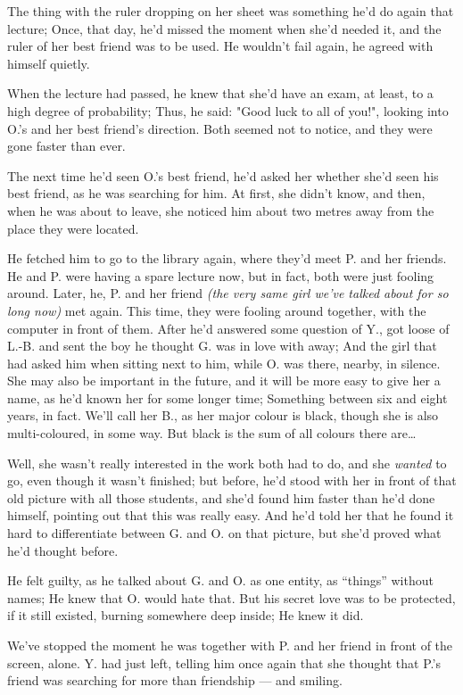 The thing with the ruler dropping on her sheet was something he'd do again that lecture; Once, that day, he'd missed the moment when she'd needed it, and the ruler of her best friend was to be used. 
He wouldn't fail again, he agreed with himself quietly.

When the lecture had passed, he knew that she'd have an exam, at least, to a high degree of probability; Thus, he said: "Good luck to all of you!", looking into O.'s and her best friend's direction. 
Both seemed not to notice, and they were gone faster than ever.

The next time he'd seen O.'s best friend, he'd asked her whether she'd seen his best friend, as he was searching for him. At first, she didn't know, and then, when he was about to leave, she noticed him about two metres away from the place they were located.

He fetched him to go to the library again, where they'd meet P. and her friends. He and P. were having a spare lecture now, but in fact, both were just fooling around. 
Later, he, P. and her friend \emph{(the very same girl we've talked about for so long now)} met again. This time, they were fooling around together, with the computer in front of them. After he'd answered some question of Y., got loose of L.-B. and sent the boy he thought G. was in love with away; And the girl that had asked him when sitting next to him, while O. was there, nearby, in silence. She may also be important in the future, and it will be more easy to give her a name, as he'd known her for some longer time; Something between six and eight years, in fact. We'll call her B., as her major colour is black, though she is also multi-coloured, in some way. But black is the sum of all colours there are\dots{}

Well, she wasn't really interested in the work both had to do, and she \emph{wanted} to go, even though it wasn't finished; but before, he'd stood with her in front of that old picture with all those students, and she'd found him faster than he'd done himself, pointing out that this was really easy. And he'd told her that he found it hard to differentiate between G. and O. on that picture, but she'd proved what he'd thought before.

He felt guilty, as he talked about G. and O. as one entity, as \enquote{things} without names; He knew that O. would hate that. But his secret love was to be protected, if it still existed, burning somewhere deep inside; He knew it did.

We've stopped the moment he was together with P. and her friend in front of the screen, alone. Y. had just left, telling him once again that she thought that P.'s friend was searching for more than friendship --- and smiling.


